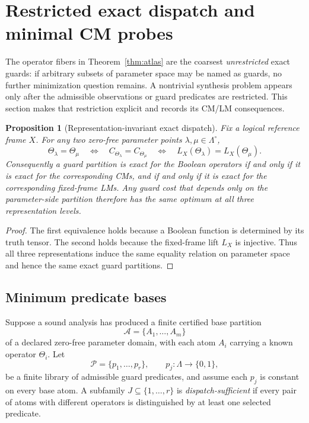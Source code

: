 \documentclass[11pt]{article}
\newtheorem{proposition}[theorem]{Proposition}
\theoremstyle{definition}
\theoremstyle{remark}
\begin{document}
\section{Restricted exact dispatch and minimal CM probes}\label{sec:minimaldispatch}

The operator fibers in Theorem~\ref{thm:atlas} are the coarsest \emph{unrestricted} exact guards: if arbitrary subsets of parameter space may be named as guards, no further minimization question remains. A nontrivial synthesis problem appears only after the admissible observations or guard predicates are restricted. This section makes that restriction explicit and records its CM/LM consequences.

\begin{proposition}[Representation-invariant exact dispatch]\label{prop:reprdispatch}
Fix a logical reference frame $X$. For any two zero-free parameter points $\lambda,\mu\in\Lambda^\circ$,
\[
 \Theta_\lambda=\Theta_\mu
 \quad\Longleftrightarrow\quad
 C_{\Theta_\lambda}=C_{\Theta_\mu}
 \quad\Longleftrightarrow\quad
 L_X(\Theta_\lambda)=L_X(\Theta_\mu).
\]
Consequently a guard partition is exact for the Boolean operators if and only if it is exact for the corresponding CMs, and if and only if it is exact for the corresponding fixed-frame LMs. Any guard cost that depends only on the parameter-side partition therefore has the same optimum at all three representation levels.
\end{proposition}

\begin{proof}
The first equivalence holds because a Boolean function is determined by its truth tensor. The second holds because the fixed-frame lift $L_X$ is injective. Thus all three representations induce the same equality relation on parameter space and hence the same exact guard partitions.
\end{proof}

\subsection{Minimum predicate bases}

Suppose a sound analysis has produced a finite certified base partition
\[
 \mathcal A=\{A_1,\ldots,A_m\}
\]
of a declared zero-free parameter domain, with each atom $A_i$ carrying a known operator $\Theta_i$. Let
\[
 \mathcal P=\{p_1,\ldots,p_r\},\qquad p_j:\Lambda\to\{0,1\},
\]
be a finite library of admissible guard predicates, and assume each $p_j$ is constant on every base atom. A subfamily $J\subseteq\{1,\ldots,r\}$ is \emph{dispatch-sufficient} if every pair of atoms with different operators is distinguished by at least one selected predicate.
\end{document}
